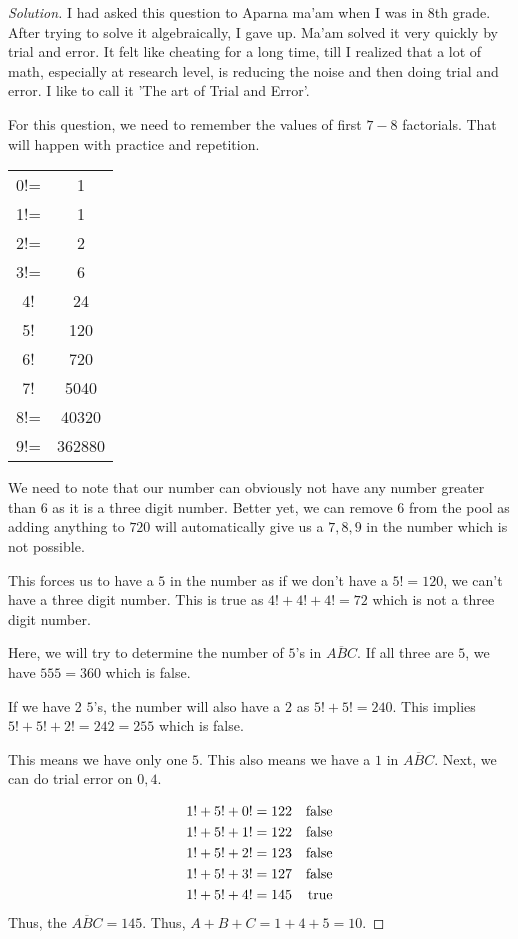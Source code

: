 \begin{proof}
    [Solution]
    I had asked this question to Aparna ma'am when I was in 8th grade. After trying to solve it algebraically, 
    I gave up. Ma'am solved it very quickly by trial and error. It felt like cheating for a long time, 
    till I realized that a lot of math, especially at research level, is reducing the noise and then doing 
    trial and error. I like to call it 'The art of Trial and Error'.\par
    For this question, we need to remember the values of first $7-8$ factorials. 
    That will happen with practice and repetition.
    \begin{table}
        \centering
        \begin{tabular}{cc}
            0!= & 1\\
            1!=& 1 \\
            2!=& 2\\
             3!=& 6\\
             4! & 24\\
             5! & 120\\
             6! & 720\\
             7! & 5040\\
             8!= & 40320\\
             9!= & 362880\\
    \end{tabular}
    \end{table}
    We need to note that our number can obviously not have any number greater than $6$ as it is a
    three digit number. Better yet, we can remove $6$ from the pool as adding anything to $720$ will 
    automatically give us a $7,8,9$ in the number which is not possible.\par
    This forces us to have a $5$ in the number as if we don't have a $5!=120$, we can't have a three 
    digit number. This is true as $4!+4!+4!=72$ which is not a three digit number.\par
    Here, we will try to determine the number of $5$'s in $\overline{ABC}$. If all three are $5$, 
    we have $555=360$ which is false.\par
    If we have 2 $5$'s, the number will also have a $2$ as $5!+5!=240$. This implies $5!+5!+2!=242=255$ 
    which is false.\par
    This means we have only one $5$. This also means we have a $1$ in $\overline{ABC}$. Next, we 
    can do trial error on $0,4$.\par
    \begin{align*}
        1!+5!+0! & = 122 & \operatorname{false} \\
        1!+5!+1! & = 122 & \operatorname{false} \\
        1!+5!+2! & = 123 & \operatorname{false} \\
        1!+5!+3! & = 127 & \operatorname{false} \\
        1!+5!+4! & = 145 & \operatorname{true} \\
    \end{align*}
    Thus, the $\overline{ABC}=145$. Thus, $A+B+C=1+4+5=10$.
\end{proof}
